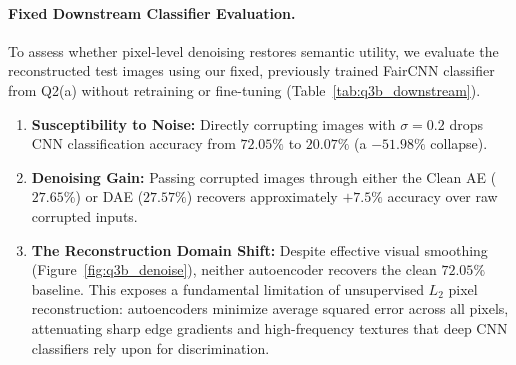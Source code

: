 \begin{table}[t]
\centering
\caption{Q3(b) Downstream classification accuracy on the official CIFAR-10 test set using the fixed, frozen FairCNN classifier from Q2(a) ($72.05\%$ clean baseline). Both autoencoders receive identical corrupted test inputs.}
\label{tab:q3b_downstream}
\end{table}

\paragraph{Fixed Downstream Classifier Evaluation.}
To assess whether pixel-level denoising restores semantic utility, we evaluate the reconstructed test images using our fixed, previously trained FairCNN classifier from Q2(a) without retraining or fine-tuning (Table~\ref{tab:q3b_downstream}). 
\begin{enumerate}
    \item \textbf{Susceptibility to Noise:} Directly corrupting images with $\sigma=0.2$ drops CNN classification accuracy from $72.05\%$ to $20.07\%$ (a $-51.98\%$ collapse).
    \item \textbf{Denoising Gain:} Passing corrupted images through either the Clean AE ($27.65\%$) or DAE ($27.57\%$) recovers approximately $+7.5\%$ accuracy over raw corrupted inputs.
    \item \textbf{The Reconstruction Domain Shift:} Despite effective visual smoothing (Figure~\ref{fig:q3b_denoise}), neither autoencoder recovers the clean $72.05\%$ baseline. This exposes a fundamental limitation of unsupervised $L_2$ pixel reconstruction: autoencoders minimize average squared error across all pixels, attenuating sharp edge gradients and high-frequency textures that deep CNN classifiers rely upon for discrimination.
\end{enumerate}

